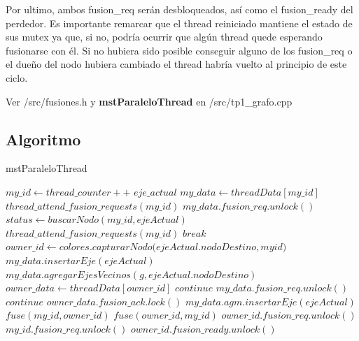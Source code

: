 Por ultimo, ambos fusion\_req serán desbloqueados, así como el fusion\_ready del perdedor. Es importante remarcar que el thread reiniciado mantiene el estado de sus mutex ya que, si no, podría ocurrir que algún thread quede esperando fusionarse con él. Si no hubiera sido posible conseguir alguno de los fusion\_req o el dueño del nodo hubiera cambiado el thread habría vuelto al principio de este ciclo.

Ver \textmd{/src/fusiones.h} y \textbf{mstParaleloThread} en \textmd{/src/tp1_grafo.cpp}

\subsection{Algoritmo}

\begin{algorithm}
    \begin{algorithmic}
        \caption{mstParaleloThread}
            \STATE $my\_id \gets thread\_counter++ $
            \STATE $eje\_actual$
            \STATE $my\_data \gets threadData[my\_id]$
                \STATE $thread\_attend\_fusion\_requests(my\_id)$
                \STATE $my\_data.fusion\_req.unlock()$
                \STATE $status \gets buscarNodo(my\_id,ejeActual)$
                    \STATE $thread\_attend\_fusion\_requests(my\_id)$
                \ENDIF
                    \STATE $break$
                \ENDIF
                \STATE $owner\_id \gets colores.capturarNodo(ejeActual.nodoDestino,my$\textunderscore$id)$
                    \STATE $my\_data.insertarEje(ejeActual)$
                    \STATE $my\_data.agregarEjesVecinos(g,ejeActual.nodoDestino)$
                \ELSE 
                    \STATE $owner\_data \gets threadData[owner\_id]$
                        \STATE $continue$
                    \ENDIF
                        \STATE $my\_data.fusion\_req.unlock()$
                        \STATE $continue$
                    \ENDIF
                    \STATE $owner\_data.fusion\_ack.lock()$
                        \STATE $my\_data.agm.insertarEje(ejeActual)$
                            \STATE $fuse(my\_id,owner\_id)$
                        \ELSE
                            \STATE $fuse(owner\_id,my\_id)$
                        \ENDIF
                    \ENDIF
                \ENDIF
                \STATE $owner\_id.fusion\_req.unlock()$
                \STATE $my\_id.fusion\_req.unlock()$
                \STATE $owner\_id.fusion\_ready.unlock()$
            \ENDWHILE
    \end{algorithmic}
\end{algorithm}

